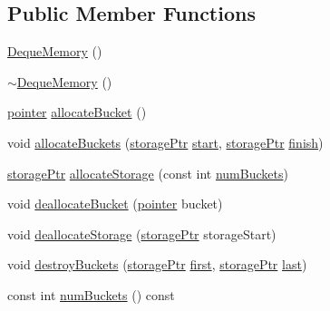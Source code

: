 \subsection*{Public Member Functions}
\begin{DoxyCompactItemize}
\item 
\hyperlink{structprism_1_1aux_1_1_deque_memory_ae858909cafd50c86fe2905d504eed125}{Deque\+Memory} ()
\item 
\hyperlink{structprism_1_1aux_1_1_deque_memory_a850791324a074b28ab98f124896f26b6}{$\sim$\+Deque\+Memory} ()
\item 
\hyperlink{structprism_1_1aux_1_1_deque_memory_a049807cdb47e3a25795342851d9c77aa}{pointer} \hyperlink{structprism_1_1aux_1_1_deque_memory_af610d956d4cf74e0cfb7cfa134438686}{allocate\+Bucket} ()
\item 
void \hyperlink{structprism_1_1aux_1_1_deque_memory_afc25cce4a26d8cdc39a1608ee4fa4d50}{allocate\+Buckets} (\hyperlink{structprism_1_1aux_1_1_deque_memory_a94284c2277f5fbe4b5d0725467d5a6d3}{storage\+Ptr} \hyperlink{structprism_1_1aux_1_1_deque_memory_aa7e9880e7681523029c4d7664d7743f2}{start}, \hyperlink{structprism_1_1aux_1_1_deque_memory_a94284c2277f5fbe4b5d0725467d5a6d3}{storage\+Ptr} \hyperlink{structprism_1_1aux_1_1_deque_memory_abc882c56fe6797c766bea89924801020}{finish})
\item 
\hyperlink{structprism_1_1aux_1_1_deque_memory_a94284c2277f5fbe4b5d0725467d5a6d3}{storage\+Ptr} \hyperlink{structprism_1_1aux_1_1_deque_memory_a35eaa6321baddaff4fd436aec3f3a718}{allocate\+Storage} (const int \hyperlink{structprism_1_1aux_1_1_deque_memory_acd3af6cc4ccbb124815819533463542d}{num\+Buckets})
\item 
void \hyperlink{structprism_1_1aux_1_1_deque_memory_a474903c0ccb976430724aa5b9988c4bc}{deallocate\+Bucket} (\hyperlink{structprism_1_1aux_1_1_deque_memory_a049807cdb47e3a25795342851d9c77aa}{pointer} bucket)
\item 
void \hyperlink{structprism_1_1aux_1_1_deque_memory_a25a968c2d9386b10a68d3220aa3283f8}{deallocate\+Storage} (\hyperlink{structprism_1_1aux_1_1_deque_memory_a94284c2277f5fbe4b5d0725467d5a6d3}{storage\+Ptr} storage\+Start)
\item 
void \hyperlink{structprism_1_1aux_1_1_deque_memory_a0748d04e88f3f0966e2987835a17f133}{destroy\+Buckets} (\hyperlink{structprism_1_1aux_1_1_deque_memory_a94284c2277f5fbe4b5d0725467d5a6d3}{storage\+Ptr} \hyperlink{namespaceprism_1_1aux_a16674f8b7bafe0844292be51e17dafa1}{first}, \hyperlink{structprism_1_1aux_1_1_deque_memory_a94284c2277f5fbe4b5d0725467d5a6d3}{storage\+Ptr} \hyperlink{namespaceprism_1_1aux_a23a89c64fd9ee1f27799fe56c943a44d}{last})
\item 
const int \hyperlink{structprism_1_1aux_1_1_deque_memory_acd3af6cc4ccbb124815819533463542d}{num\+Buckets} () const 
\end{DoxyCompactItemize}
